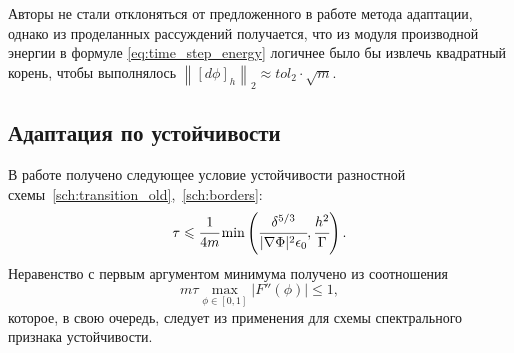 Авторы не стали отклоняться от предложенного в работе \cite{zhang_time_step} метода адаптации, однако из проделанных рассуждений получается, что из модуля производной энергии в формуле \eqref{eq:time_step_energy} логичнее было бы извлечь квадратный корень, чтобы выполнялось $\left\| [d \phi]_h \right\|_2 \approx tol_2 \cdot \sqrt{m}$.


\subsection{Адаптация по устойчивости}

В работе \cite{ponomarev_stability} получено следующее условие устойчивости разностной схемы~\eqref{sch:transition_old},~\eqref{sch:borders}:
\[
	\tau \leqslant \cfrac{1}{4m} \min \left( \cfrac{\delta^{5/3}}{|\nabla \Phi|^2 \epsilon_0}, \cfrac{h^2}{\Gamma} \right).
\]
Неравенство с первым аргументом минимума получено из соотношения
\[
	m \tau \max\limits_{\phi \in [0, 1]} |F''(\phi)| \leqslant 1, 
\]
которое, в свою очередь, следует из применения для схемы спектрального признака устойчивости.

